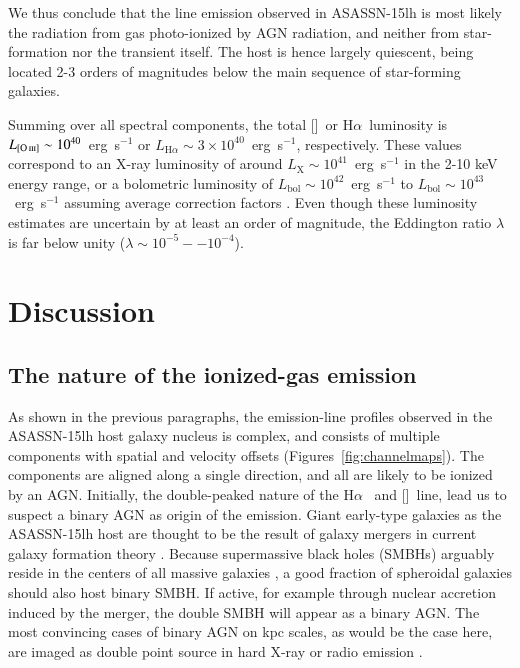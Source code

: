 \documentclass[traditabstract]{aa}
\newcommand{\ha}{H$\alpha$}
\newcommand{\oiii}{[\ion{O}{iii}]}
\newcommand{\nii}{[\ion{N}{ii}]}
\begin{document}
We thus conclude that the line emission observed in ASASSN-15lh is most likely the radiation from gas photo-ionized by AGN radiation, and neither from star-formation nor the transient itself. The host is hence largely quiescent, being located 2-3 orders of magnitudes below the main sequence of star-forming galaxies.

Summing over all spectral components, the total \oiii~or \ha~luminosity is $L_{\oiii}\sim10^{40}$~erg~s$^{-1}$ or $L_{\mathrm{H}\alpha} \sim 3 \times 10^{40}$~erg~s$^{-1}$, respectively. These values correspond to an X-ray luminosity of around $L_{\mathrm{X}}\sim10^{41}$~erg~s$^{-1}$ in the 2-10 keV energy range, or a bolometric luminosity of $L_{\mathrm{bol}}\sim10^{42}$~erg~s$^{-1}$ to $L_{\mathrm{bol}}\sim10^{43}$~erg~s$^{-1}$ assuming average correction factors \citep{2008ARA&A..46..475H, 2009A&A...504...73L, 2012MNRAS.425..623L}. Even though these luminosity estimates are uncertain by at least an order of magnitude, the Eddington ratio $\lambda$ is far below unity ($\lambda\sim10^{-5}--10^{-4}$).

\section{Discussion}
\label{sec:Disc}

\subsection{The nature of the ionized-gas emission}

As shown in the previous paragraphs, the emission-line profiles observed in the ASASSN-15lh host galaxy nucleus is complex, and consists of multiple components with spatial and velocity offsets (Figures~\ref{fig:channelmaps}). The components are aligned along a single direction, and all are likely to be ionized by an AGN. Initially, the double-peaked nature of the \ha~ and \nii~line, lead us to suspect a binary AGN as origin of the emission. Giant early-type galaxies as the ASASSN-15lh host are thought to be the result of galaxy mergers in current galaxy formation theory \citep[e.g.,][and references therein]{2006ApJS..163....1H}. Because supermassive black holes (SMBHs) arguably reside in the centers of all massive galaxies \citep[e.g.,][for a review]{2013ARA&A..51..511K}, a good fraction of spheroidal galaxies should also host binary SMBH. If active, for example through nuclear accretion induced by the merger, the double SMBH will appear as a binary AGN. The most convincing cases of binary AGN on kpc scales, as would be the case here, are imaged as double point source in hard X-ray \citep[e.g.,][]{2003ApJ...582L..15K, 2008MNRAS.386..105B} or radio emission \citep{2011ApJ...740L..44F, 2015ApJ...813..103M}.
\end{document}
